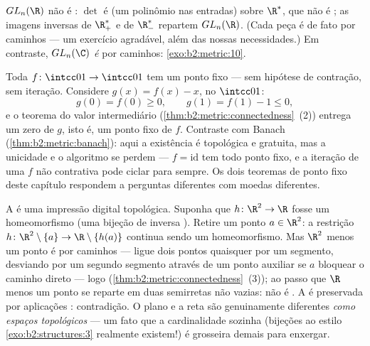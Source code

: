 \begin{example}\label{ex:b2:metric:glnr}
$GL_n(\R)$ não é : $\det$ é  (um polinômio nas
entradas) sobre $\R^*$, que não é ; as imagens inversas de
$\R_+^*$ e de $\R_-^*$ repartem $GL_n(\R)$. (Cada peça é de fato
 por caminhos --- um exercício agradável, além das nossas necessidades.) Em
contraste, $GL_n(\C)$ \emph{é}  por caminhos:
\cref{exo:b2:metric:10}.
\end{example}

\begin{example}\label{ex:b2:metric:ivtfixed}
Toda $f \colon \intcc01 \to \intcc01$  tem um ponto
fixo --- sem hipótese de contração, sem iteração. Considere
$g(x) = f(x) - x$,  no  $\intcc01$:
\[
g(0) = f(0) \geq 0,
\qquad
g(1) = f(1) - 1 \leq 0 ,
\]
e o teorema do valor intermediário
(\cref{thm:b2:metric:connectedness}~(2)) entrega um zero de
$g$, isto é, um ponto fixo de $f$. Contraste com Banach
(\cref{thm:b2:metric:banach}): aqui a existência é topológica
e gratuita, mas a unicidade e o algoritmo se perdem --- $f =
\mathrm{id}$ tem todo ponto fixo, e a iteração de uma
$f$ não contrativa pode ciclar para sempre. Os dois teoremas
de ponto fixo deste capítulo respondem a perguntas diferentes com
moedas diferentes.
\end{example}

\begin{example}\label{ex:b2:metric:rnotr2}
A  é uma impressão digital topológica. Suponha que $h \colon
\R^2 \to \R$ fosse um homeomorfismo (uma bijeção  de inversa
). Retire um ponto $a \in \R^2$: a
restrição $h \colon \R^2\setminus\{a\} \to
\R\setminus\{h(a)\}$ continua sendo um homeomorfismo. Mas $\R^2$ menos
um ponto é  por caminhos --- ligue dois pontos quaisquer por um segmento,
desviando por um segundo segmento através de um ponto auxiliar se
$a$ bloquear o caminho direto --- logo 
(\cref{thm:b2:metric:connectedness}~(3)); ao passo que $\R$ menos um
ponto se reparte em duas semirretas  não vazias: não é .
A  é preservada por aplicações : contradição.
O plano e a reta são genuinamente diferentes \emph{como
espaços topológicos} --- um fato que a cardinalidade sozinha
(bijeções ao estilo \cref{exo:b2:structures:3} realmente existem!) é grosseira
demais para enxergar.
\end{example}


